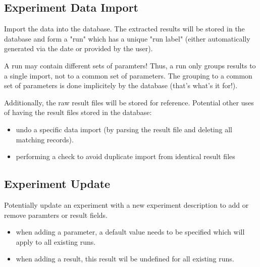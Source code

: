 \documentclass[12pt,a4paper]{article}
\begin{document}
\subsection{Experiment Data Import}
\label{sec:data-imp}
Import the data into the database. The extracted results will be stored
in the database and form a "run" which has a unique "run label" (either
automatically generated via the date or provided by the user).    
   
A run may contain different sets of paramters! Thus, a run only groups
results to a single import, not to a common set of parameters. The 
grouping to a common set of parameters is done implicitely by the
database (that's what's it for!).

Additionally, the raw result files will be stored for reference.
Potential other uses of having the result files stored in the database:
\begin{itemize}
   \item undo a specific data import (by parsing the result file and deleting
     all matching records).
   \item performing a check to avoid duplicate import from identical result files
\end{itemize}

\subsection{Experiment Update}
\label{sec:exp-up}
Potentially update an experiment with a new experiment description to add
or remove paramters or result fields.
\begin{itemize}
 \item when adding a parameter, a default value needs to be specified which 
       will apply to all existing runs.
 \item when adding a result, this result wil be undefined for all existing runs.
\end{itemize}   
\end{document}
